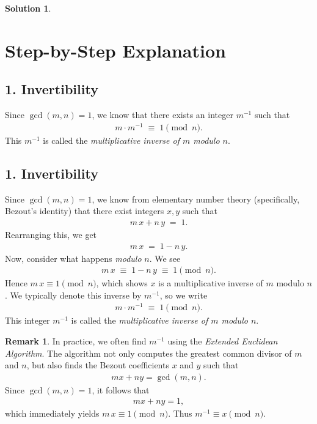 \documentclass[12pt]{article}
\theoremstyle{definition} %
\newtheorem{solution}{Solution}
\newtheorem{remark}{Remark}
\theoremstyle{plain} %
\begin{document}
\begin{solution}
\section*{Step-by-Step Explanation}

\subsection*{1. Invertibility}

Since $\gcd(m,n) = 1$, we know that there exists an integer $m^{-1}$ such that
\begin{align}
m \cdot m^{-1} \;\equiv\; 1 \pmod{n}.
\end{align}
This $m^{-1}$ is called the \emph{multiplicative inverse of $m$ modulo $n$}.
\subsection*{1. Invertibility}

Since $\gcd(m,n) = 1$, we know from elementary number theory (specifically, Bezout's identity) that there exist integers $x, y$ such that
\begin{align}
m \,x + n \,y \;=\; 1.
\end{align}
Rearranging this, we get
\begin{align}
m \,x \;=\; 1 - n\,y.
\end{align}
Now, consider what happens \emph{modulo} $n$. We see
\begin{align}
m \,x 
\;\equiv\; 1 - n\,y 
\;\equiv\; 1
\pmod{n}.
\end{align}
Hence $m \,x \equiv 1 \pmod{n}$, which shows $x$ is a multiplicative inverse of $m$ modulo $n$. We typically denote this inverse by $m^{-1}$, so we write
\begin{align}
m \cdot m^{-1} \;\equiv\; 1 \pmod{n}.
\end{align}
This integer $m^{-1}$ is called the \emph{multiplicative inverse of $m$ modulo $n$}.

\begin{remark}
In practice, we often find $m^{-1}$ using the \emph{Extended Euclidean Algorithm}. The algorithm not only computes the greatest common divisor of $m$ and $n$, but also finds the Bezout coefficients $x$ and $y$ such that
\begin{align}
m x + n y = \gcd(m,n).
\end{align}
Since $\gcd(m,n)=1$, it follows that
\begin{align}
m x + n y = 1,
\end{align}
which immediately yields $m\,x \equiv 1 \pmod{n}$. Thus $m^{-1} \equiv x \pmod{n}$.
\end{remark}

\end{solution}
\end{document}
